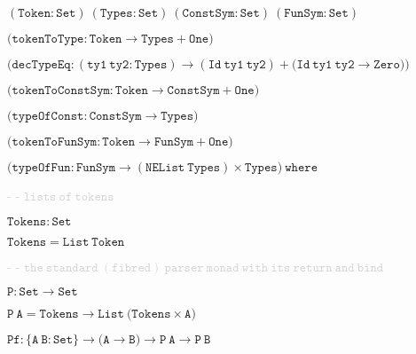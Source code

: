 \hspace{0.75cm}
{\small{$\mathtt{(Token : Set) ~ (Types : Set) ~ (ConstSym : Set) ~ (FunSym : Set)}$}}

\hspace{0.75cm}
{\small{$\mathtt{(tokenToType : Token} \to \mathtt{Types} + \mathtt{One)}$}}

\hspace{0.75cm}
{\small{$\mathtt{(decTypeEq : (ty1 ~ ty2 : Types)} \to \mathtt{(Id ~ ty1 ~ ty2)} + \mathtt{(Id ~ ty1 ~ ty2} \to \mathtt{Zero))}$}}

\hspace{0.75cm}
{\small{$\mathtt{(tokenToConstSym : Token} \to \mathtt{ConstSym} + \mathtt{One)}$}}

\hspace{0.75cm}
{\small{$\mathtt{(typeOfConst : ConstSym} \to \mathtt{Types)}$}}

\hspace{0.75cm}
{\small{$\mathtt{(tokenToFunSym : Token} \to \mathtt{FunSym} + \mathtt{One)}$}}

\hspace{0.75cm}
{\small{$\mathtt{(typeOfFun : FunSym} \to \mathtt{(NEList ~ Types)} \times \mathtt{Types) ~where}$}}

\vspace{0.25cm}

\hspace{0.25cm}
{\small{\textcolor{lightgray}{- - $\mathtt{lists ~ of ~ tokens}$}}}

\hspace{0.25cm}
{\small{$\mathtt{Tokens : Set}$}}

\hspace{0.25cm}
{\small{$\mathtt{Tokens = List ~ Token}$}}

\vspace{0.25cm}

\hspace{0.25cm}
{\small{\textcolor{lightgray}{- - $\mathtt{the ~ standard ~(fibred) ~ parser ~ monad ~ with ~ its ~ return ~ and ~ bind}$}}}

\hspace{0.25cm}
{\small{$\mathtt{P : Set} \to \mathtt{Set}$}}

\hspace{0.25cm}
{\small{$\mathtt{P ~ A = Tokens} \to \mathtt{List ~ (Tokens} \times \mathtt{A)}$}}

\vspace{0.25cm}

\hspace{0.25cm}
{\small{$\mathtt{Pf : \{A ~B : Set\}} \to \mathtt{(A} \to \mathtt{B)} \to \mathtt{P ~A} \to \mathtt{P ~B}$}}

